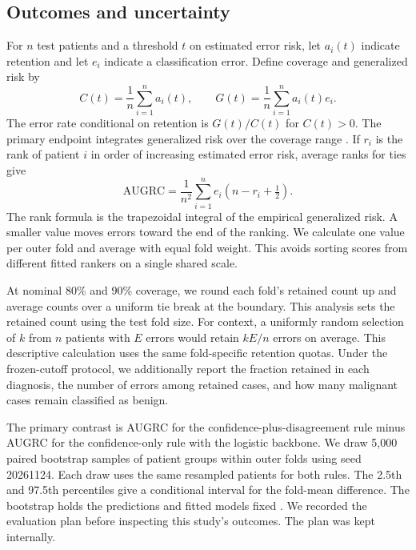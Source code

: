 \documentclass[11pt]{article}
\begin{document}
\subsection{Outcomes and uncertainty}
For $n$ test patients and a threshold $t$ on estimated error risk, let $a_i(t)$ indicate retention and let $e_i$ indicate a classification error. Define coverage and generalized risk by
\begin{equation}
C(t)=\frac{1}{n}\sum_{i=1}^{n} a_i(t), \qquad
G(t)=\frac{1}{n}\sum_{i=1}^{n} a_i(t)e_i.
\end{equation}
The error rate conditional on retention is $G(t)/C(t)$ for $C(t)>0$. The primary endpoint integrates generalized risk over the coverage range \cite{traub}. If $r_i$ is the rank of patient $i$ in order of increasing estimated error risk, average ranks for ties give
\begin{equation}
\mathrm{AUGRC}=\frac{1}{n^2}\sum_{i=1}^{n} e_i\left(n-r_i+\tfrac{1}{2}\right).
\end{equation}
The rank formula is the trapezoidal integral of the empirical generalized risk. A smaller value moves errors toward the end of the ranking. We calculate one value per outer fold and average with equal fold weight. This avoids sorting scores from different fitted rankers on a single shared scale.

At nominal 80\% and 90\% coverage, we round each fold's retained count up and average counts over a uniform tie break at the boundary. This analysis sets the retained count using the test fold size. For context, a uniformly random selection of $k$ from $n$ patients with $E$ errors would retain $kE/n$ errors on average. This descriptive calculation uses the same fold-specific retention quotas. Under the frozen-cutoff protocol, we additionally report the fraction retained in each diagnosis, the number of errors among retained cases, and how many malignant cases remain classified as benign.

The primary contrast is AUGRC for the confidence-plus-disagreement rule minus AUGRC for the confidence-only rule with the logistic backbone. We draw 5,000 paired bootstrap samples of patient groups within outer folds using seed 20261124. Each draw uses the same resampled patients for both rules. The 2.5th and 97.5th percentiles give a conditional interval for the fold-mean difference. The bootstrap holds the predictions and fitted models fixed \cite{rutter}. We recorded the evaluation plan before inspecting this study's outcomes. The plan was kept internally.
\end{document}
